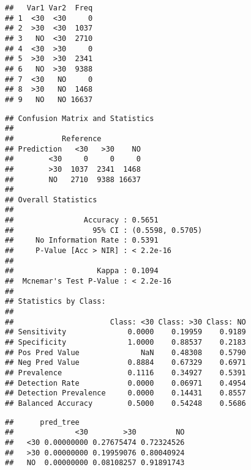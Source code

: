 \documentclass[]{article}
\newenvironment{Shaded}{\begin{snugshade}}{\end{snugshade}}
\newcommand{\KeywordTok}[1]{\textcolor[rgb]{0.13,0.29,0.53}{\textbf{#1}}}
\newcommand{\DecValTok}[1]{\textcolor[rgb]{0.00,0.00,0.81}{#1}}
\newcommand{\OperatorTok}[1]{\textcolor[rgb]{0.81,0.36,0.00}{\textbf{#1}}}
\newcommand{\NormalTok}[1]{#1}
\begin{document}
\begin{verbatim}
##   Var1 Var2  Freq
## 1  <30  <30     0
## 2  >30  <30  1037
## 3   NO  <30  2710
## 4  <30  >30     0
## 5  >30  >30  2341
## 6   NO  >30  9388
## 7  <30   NO     0
## 8  >30   NO  1468
## 9   NO   NO 16637
\end{verbatim}

\begin{Shaded}
\end{Shaded}

\begin{verbatim}
## Confusion Matrix and Statistics
## 
##           Reference
## Prediction   <30   >30    NO
##        <30     0     0     0
##        >30  1037  2341  1468
##        NO   2710  9388 16637
## 
## Overall Statistics
##                                           
##                Accuracy : 0.5651          
##                  95% CI : (0.5598, 0.5705)
##     No Information Rate : 0.5391          
##     P-Value [Acc > NIR] : < 2.2e-16       
##                                           
##                   Kappa : 0.1094          
##  Mcnemar's Test P-Value : < 2.2e-16       
## 
## Statistics by Class:
## 
##                      Class: <30 Class: >30 Class: NO
## Sensitivity              0.0000    0.19959    0.9189
## Specificity              1.0000    0.88537    0.2183
## Pos Pred Value              NaN    0.48308    0.5790
## Neg Pred Value           0.8884    0.67329    0.6971
## Prevalence               0.1116    0.34927    0.5391
## Detection Rate           0.0000    0.06971    0.4954
## Detection Prevalence     0.0000    0.14431    0.8557
## Balanced Accuracy        0.5000    0.54248    0.5686
\end{verbatim}

\begin{Shaded}
\end{Shaded}

\begin{verbatim}
##      pred_tree
##              <30        >30         NO
##   <30 0.00000000 0.27675474 0.72324526
##   >30 0.00000000 0.19959076 0.80040924
##   NO  0.00000000 0.08108257 0.91891743
\end{verbatim}
\end{document}
